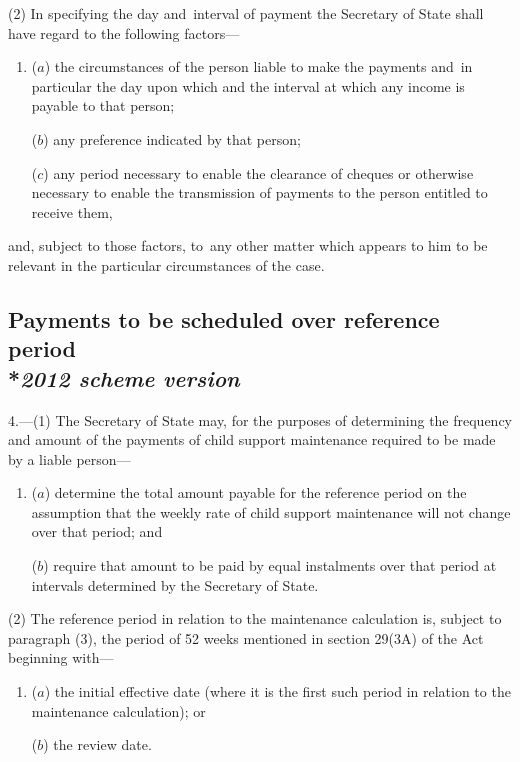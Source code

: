 \documentclass[12pt,a4paper]{article}
\begin{document}
(2) In specifying the day and~interval of payment the Secretary of State shall have regard to the following factors—
\begin{enumerate}\item[]
($a$) the circumstances of the person liable to make the payments and~in particular the day upon which and the interval at which any income is payable to that person;

($b$) any preference indicated by that person;

($c$) any period necessary to enable the clearance of cheques or otherwise necessary to enable the transmission of payments to the person entitled to receive them,
\end{enumerate}
and, subject to those factors, to~any other matter which appears to him to be relevant in the particular circumstances of the case.


\subsection[Payments to be scheduled over reference period --- \emph{2012 scheme version}]{Payments to be scheduled over reference period\\*\emph{2012 scheme version}}

4.---(1)  The Secretary of State may, for the purposes of determining the frequency and amount of the payments of child support maintenance required to be made by a liable person—
\begin{enumerate}\item[]
($a$) determine the total amount payable for the reference period on the assumption that the weekly rate of child support maintenance will not change over that period; and

($b$) require that amount to be paid by equal instalments over that period at intervals determined by the Secretary of State.
\end{enumerate}

(2) The reference period in relation to the maintenance calculation is, subject to paragraph (3), the period of 52 weeks mentioned in section 29(3A) of the Act beginning with—
\begin{enumerate}\item[]
($a$) the initial effective date (where it is the first such period in relation to the maintenance calculation); or

($b$) the review date.
\end{enumerate}
\end{document}
